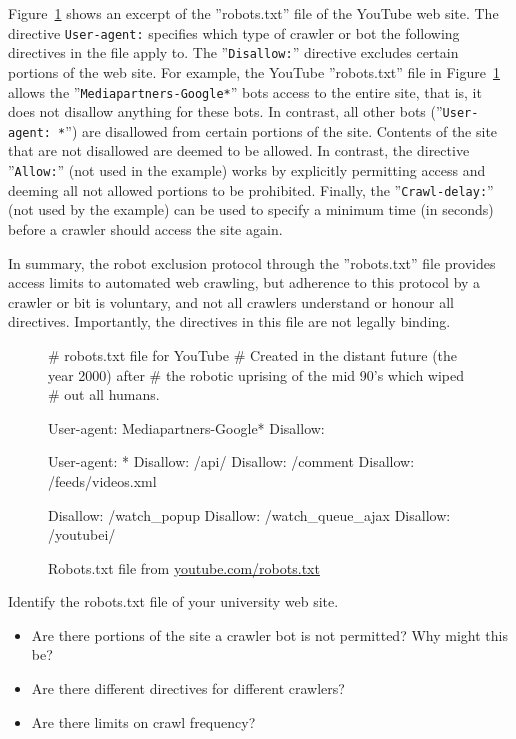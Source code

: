\begin{withcode}
Figure~\ref{fig:youtuberobots} shows an excerpt of the ''robots.txt'' file of the YouTube web site. The directive \texttt{User-agent:} specifies which type of crawler or bot the following directives in the file apply to. The ''\texttt{Disallow:}'' directive excludes certain portions of the web site. For example, the YouTube ''robots.txt''  file in Figure~\ref{fig:youtuberobots} allows the ''\texttt{Mediapartners-Google*}'' bots access to the entire site, that is, it does not disallow anything for these bots. In contrast, all other bots (''\texttt{User-agent: *}'') are disallowed from certain portions of the site. Contents of the site that are not disallowed are deemed to be allowed. In contrast, the directive ''\texttt{Allow:}'' (not used in the example) works by explicitly permitting access and deeming all not allowed portions to be prohibited. Finally, the ''\texttt{Crawl-delay:}'' (not used by the example) can be used to specify a minimum time (in seconds) before a crawler should access the site again.

In summary, the robot exclusion protocol through the ''robots.txt'' file provides access limits to automated web crawling, but adherence to this protocol by a crawler or bit is voluntary, and not all crawlers understand or honour all directives. Importantly, the directives in this file are not legally binding.

\begin{figure}
\begin{textcode}
# robots.txt file for YouTube
# Created in the distant future (the year 2000) after
# the robotic uprising of the mid 90's which wiped 
# out all humans.

User-agent: Mediapartners-Google*
Disallow:

User-agent: *
Disallow: /api/
Disallow: /comment
Disallow: /feeds/videos.xml

Disallow: /watch_popup
Disallow: /watch_queue_ajax
Disallow: /youtubei/
\end{textcode}
\caption[Example robots.txt file]{Robots.txt file from \url{youtube.com/robots.txt}}
\label{fig:youtuberobots}
\end{figure}

\begin{exerciseboxcomputer}

Identify the robots.txt file of your university web site.
\begin{itemize}
  \item Are there portions of the site a crawler bot is not permitted? Why might this be?
  \item Are there different directives for different crawlers?
  \item Are there limits on crawl frequency?
\end{itemize}
\end{exerciseboxcomputer}
\end{withcode}


